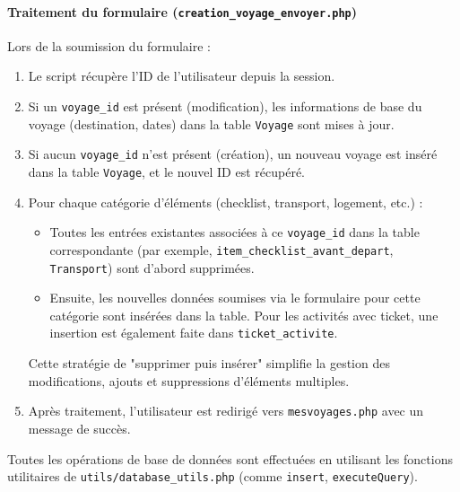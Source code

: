 \documentclass[a4paper,12pt]{article}
\begin{document}
\paragraph{Traitement du formulaire (\texttt{creation\_voyage\_envoyer.php})}
Lors de la soumission du formulaire :
\begin{enumerate}
    \item Le script récupère l'ID de l'utilisateur depuis la session.
    \item Si un \texttt{voyage\_id} est présent (modification), les informations de base du voyage (destination, dates) dans la table \texttt{Voyage} sont mises à jour.
    \item Si aucun \texttt{voyage\_id} n'est présent (création), un nouveau voyage est inséré dans la table \texttt{Voyage}, et le nouvel ID est récupéré.
    \item Pour chaque catégorie d'éléments (checklist, transport, logement, etc.) :
    \begin{itemize}
        \item Toutes les entrées existantes associées à ce \texttt{voyage\_id} dans la table correspondante (par exemple, \texttt{item\_checklist\_avant\_depart}, \texttt{Transport}) sont d'abord supprimées.
        \item Ensuite, les nouvelles données soumises via le formulaire pour cette catégorie sont insérées dans la table. Pour les activités avec ticket, une insertion est également faite dans \texttt{ticket\_activite}.
    \end{itemize}
    Cette stratégie de "supprimer puis insérer" simplifie la gestion des modifications, ajouts et suppressions d'éléments multiples.
    \item Après traitement, l'utilisateur est redirigé vers \texttt{mesvoyages.php} avec un message de succès.
\end{enumerate}
Toutes les opérations de base de données sont effectuées en utilisant les fonctions utilitaires de \texttt{utils/database\_utils.php} (comme \texttt{insert}, \texttt{executeQuery}).
\end{document}
